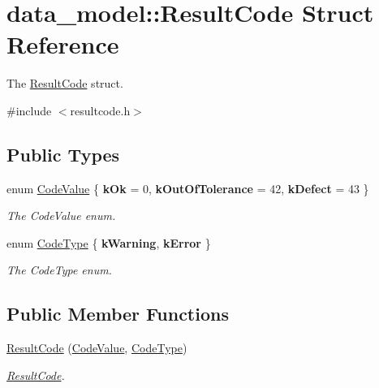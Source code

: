 \hypertarget{structdata__model_1_1_result_code}{}\section{data\+\_\+model\+:\+:Result\+Code Struct Reference}
\label{structdata__model_1_1_result_code}


The \hyperlink{structdata__model_1_1_result_code}{Result\+Code} struct.  




{\ttfamily \#include $<$resultcode.\+h$>$}

\subsection*{Public Types}
\begin{DoxyCompactItemize}
\item 
enum \hyperlink{structdata__model_1_1_result_code_a57c4d467974a51fc8475b9fd2b4ed505}{Code\+Value} \{ {\bfseries k\+Ok} = 0, 
{\bfseries k\+Out\+Of\+Tolerance} = 42, 
{\bfseries k\+Defect} = 43
 \}\hypertarget{structdata__model_1_1_result_code_a57c4d467974a51fc8475b9fd2b4ed505}{}\label{structdata__model_1_1_result_code_a57c4d467974a51fc8475b9fd2b4ed505}
\begin{DoxyCompactList}\small\item\em The Code\+Value enum. \end{DoxyCompactList}
\item 
enum \hyperlink{structdata__model_1_1_result_code_ae2d78d99add6ff3727da0474572464fd}{Code\+Type} \{ {\bfseries k\+Warning}, 
{\bfseries k\+Error}
 \}\hypertarget{structdata__model_1_1_result_code_ae2d78d99add6ff3727da0474572464fd}{}\label{structdata__model_1_1_result_code_ae2d78d99add6ff3727da0474572464fd}
\begin{DoxyCompactList}\small\item\em The Code\+Type enum. \end{DoxyCompactList}
\end{DoxyCompactItemize}
\subsection*{Public Member Functions}
\begin{DoxyCompactItemize}
\item 
\hyperlink{structdata__model_1_1_result_code_a3360d213340fe9acf9220c38c90a9fd4}{Result\+Code} (\hyperlink{structdata__model_1_1_result_code_a57c4d467974a51fc8475b9fd2b4ed505}{Code\+Value}, \hyperlink{structdata__model_1_1_result_code_ae2d78d99add6ff3727da0474572464fd}{Code\+Type})\hypertarget{structdata__model_1_1_result_code_a3360d213340fe9acf9220c38c90a9fd4}{}\label{structdata__model_1_1_result_code_a3360d213340fe9acf9220c38c90a9fd4}

\begin{DoxyCompactList}\small\item\em \hyperlink{structdata__model_1_1_result_code}{Result\+Code}. \end{DoxyCompactList}\end{DoxyCompactItemize}
